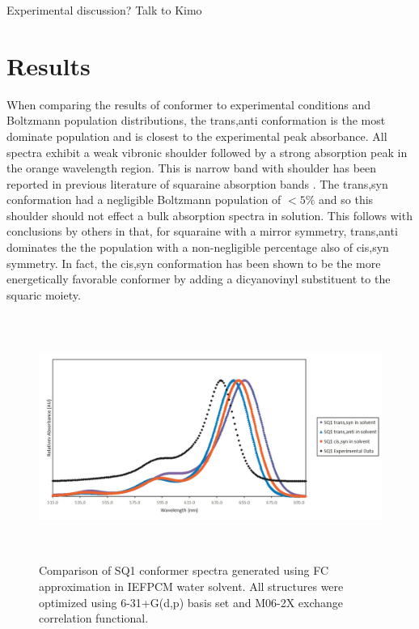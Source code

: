 \documentclass[journal=jacsat,manuscript=article]{achemso}
\begin{document}
Experimental discussion? Talk to Kimo

\section{Results}
When comparing the results of conformer to experimental conditions and Boltzmann population distributions, the trans,anti conformation is the most dominate population and is closest to the experimental peak absorbance. All spectra exhibit a weak vibronic shoulder followed by a strong absorption peak in the orange wavelength region. This is narrow band with shoulder has been reported in previous literature of squaraine absorption bands \citep{Qin2013ACells,Zheng2015ContributionDevices,Yang2017ThePerformance,Borrelli2014TheoreticalDye,Kuster2015CoupledPendulums,Brixner2017ExcitonSystems}. The trans,syn conformation had a negligible Boltzmann population of $<5\%$ and so this shoulder should not effect a bulk absorption spectra in solution. This follows with conclusions by others in that, for squaraine with a mirror symmetry, trans,anti dominates the the population with a non-negligible percentage also of cis,syn symmetry\cite{Borrelli2014TheoreticalDye}. In fact, the cis,syn conformation has been shown to be the more energetically favorable conformer by adding a dicyanovinyl substituent to the squaric moiety\cite{Qin2013ACells}.  


\begin{figure}[h]
    \centering
    \includegraphics[width=16cm,height=8cm]{figures/sq1_conformer_exp.jpg}
    \caption{Comparison of SQ1 conformer spectra generated using FC approximation in IEFPCM water solvent. All structures were optimized  using 6-31+G(d,p) basis set and M06-2X exchange correlation functional.}
    \label{fig:SQ1 conformers}
\end{figure}
\end{document}
